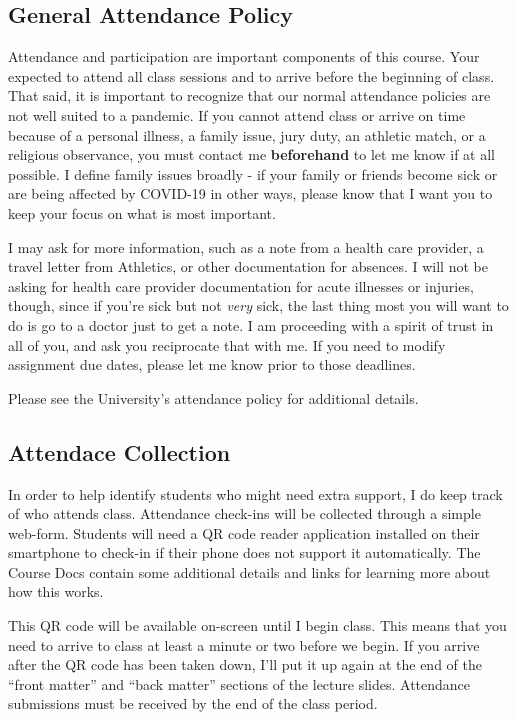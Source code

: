 \documentclass[
]{book}
\begin{document}
\hypertarget{general-attendance-policy}{%
\subsection{General Attendance Policy}\label{general-attendance-policy}}

Attendance and participation are important components of this course. Your expected to attend all class sessions and to arrive before the beginning of class. That said, it is important to recognize that our normal attendance policies are not well suited to a pandemic. If you cannot attend class or arrive on time because of a personal illness, a family issue, jury duty, an athletic match, or a religious observance, you must contact me \textbf{beforehand} to let me know if at all possible. I define family issues broadly - if your family or friends become sick or are being affected by COVID-19 in other ways, please know that I want you to keep your focus on what is most important.

I may ask for more information, such as a note from a health care provider, a travel letter from Athletics, or other documentation for absences. I will not be asking for health care provider documentation for acute illnesses or injuries, though, since if you're sick but not \emph{very} sick, the last thing most you will want to do is go to a doctor just to get a note. I am proceeding with a spirit of trust in all of you, and ask you reciprocate that with me. If you need to modify assignment due dates, please let me know prior to those deadlines.

Please see the University's attendance policy for additional details.

\hypertarget{attendace-collection}{%
\subsection{Attendace Collection}\label{attendace-collection}}

In order to help identify students who might need extra support, I do keep track of who attends class. Attendance check-ins will be collected through a simple web-form. Students will need a QR code reader application installed on their smartphone to check-in if their phone does not support it automatically. The Course Docs contain some additional details and links for learning more about how this works.

This QR code will be available on-screen until I begin class. This means that you need to arrive to class at least a minute or two before we begin. If you arrive after the QR code has been taken down, I'll put it up again at the end of the ``front matter'' and ``back matter'' sections of the lecture slides. Attendance submissions must be received by the end of the class period.
\end{document}
